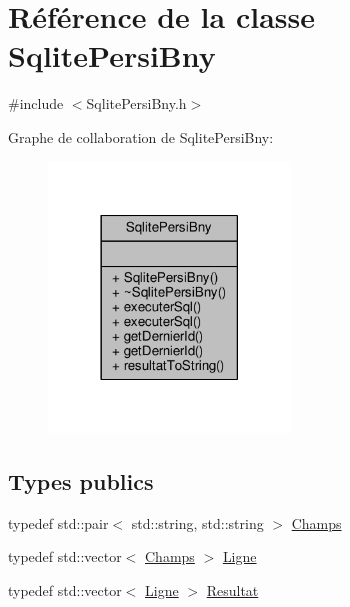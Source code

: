 \hypertarget{classSqlitePersiBny}{}\section{Référence de la classe Sqlite\+Persi\+Bny}
\label{classSqlitePersiBny}


{\ttfamily \#include $<$Sqlite\+Persi\+Bny.\+h$>$}



Graphe de collaboration de Sqlite\+Persi\+Bny\+:\nopagebreak
\begin{figure}[H]
\begin{center}
\leavevmode
\includegraphics[width=182pt]{classSqlitePersiBny__coll__graph}
\end{center}
\end{figure}
\subsection*{Types publics}
\begin{DoxyCompactItemize}
\item 
typedef std\+::pair$<$ std\+::string, std\+::string $>$ \hyperlink{classSqlitePersiBny_af3de7ea7bd4146b4ce0a00ceae01befd}{Champs}
\item 
typedef std\+::vector$<$ \hyperlink{classSqlitePersiBny_af3de7ea7bd4146b4ce0a00ceae01befd}{Champs} $>$ \hyperlink{classSqlitePersiBny_a32400b54d9a08cae7d60d985a5d48892}{Ligne}
\item 
typedef std\+::vector$<$ \hyperlink{classSqlitePersiBny_a32400b54d9a08cae7d60d985a5d48892}{Ligne} $>$ \hyperlink{classSqlitePersiBny_a04bdd1bacd9241210ea44ec2c072f79b}{Resultat}
\end{DoxyCompactItemize}
